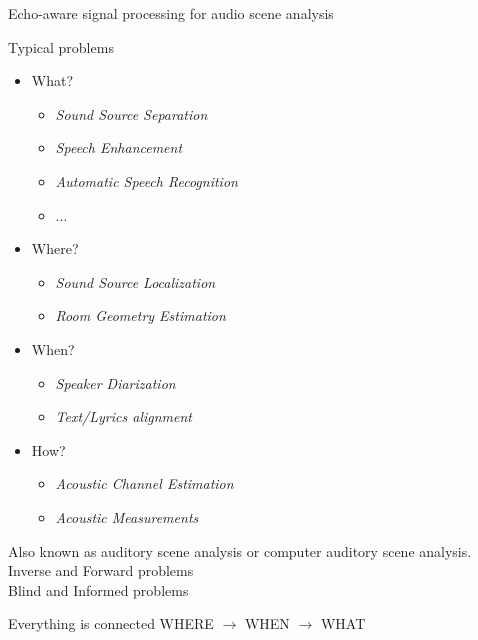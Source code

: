 \begin{frame}{Echo-aware signal processing for \alert{audio scene analysis}}

    \begin{block}{Typical problems}
        \vspace{-0.5em}
        \begin{itemize}
            \item What?
            \begin{itemize}
                \item \alert{\textit{Sound Source Separation}}
                \item \alert{\textit{Speech Enhancement}}
                \item \textit{Automatic Speech Recognition}
                \item ...
            \end{itemize}
            \item Where?
            \begin{itemize}
                \item \alert{\textit{Sound Source Localization}}
                \item \alert{\textit{Room Geometry Estimation}}
            \end{itemize}
            \item When?
            \begin{itemize}
                \item \textit{Speaker Diarization}
                \item \textit{Text/Lyrics alignment}
            \end{itemize}
            \item How?
            \begin{itemize}
                \item \textit{Acoustic Channel Estimation}
                \item \textit{Acoustic Measurements}
            \end{itemize}
        \end{itemize}
    \end{block}


    Also known as auditory scene analysis or computer auditory scene analysis.
    \\Inverse and Forward problems
    \\Blind and Informed problems

    \begin{block}{Everything is connected}
        WHERE $\rightarrow$ WHEN $\rightarrow$ WHAT
    \end{block}

\end{frame}


